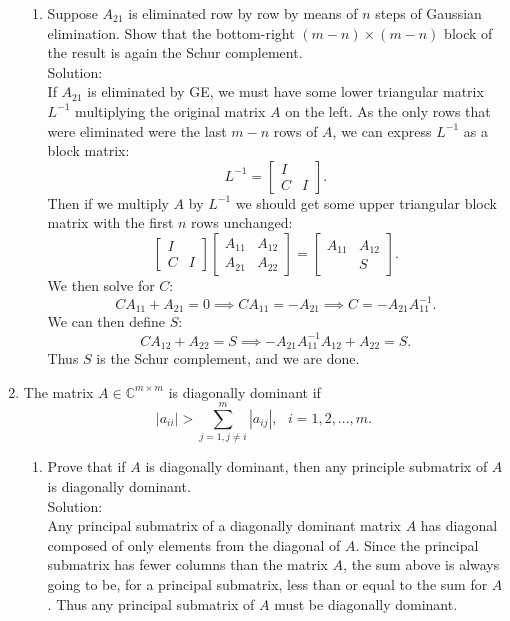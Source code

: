 \documentclass[12pt]{article}
\numberwithin{equation}{section}
\newcommand{\A}{\mathcal{A}}
\begin{document}
\begin{enumerate}
\begin{enumerate}
\item Suppose $A_{21}$ is eliminated row by row by means of $n$ steps of Gaussian elimination. Show that the bottom-right $(m-n)\times (m-n)$ block of the result is again the Schur complement.\\

Solution:\\

If $A_{21}$ is eliminated by GE, we must have some lower triangular matrix $L^{-1}$ multiplying the original matrix $A$ on the left. As the only rows that were eliminated were the last $m-n$ rows of $A$, we can express $L^{-1}$ as a block matrix:
$$L^{-1}=\left[\begin{array}{cc}I&\\C&I\end{array}\right].$$
Then if we multiply $A$ by $L^{-1}$ we should get some upper triangular block matrix with the first $n$ rows unchanged:
$$\left[\begin{array}{cc}I&\\C&I\end{array}\right]\left[\begin{array}{cc}A_{11}&A_{12}\\A_{21}&A_{22}\end{array}\right]=\left[\begin{array}{cc}A_{11}&A_{12}\\&S\end{array}\right].$$
We then solve for $C$:
$$CA_{11}+A_{21}=0\implies CA_{11}=-A_{21}\implies C=-A_{21}A_{11}^{-1}.$$
We can then define $S$:
$$CA_{12}+A_{22}=S\implies -A_{21}A_{11}^{-1}A_{12}+A_{22}=S.$$
Thus $S$ is the Schur complement, and we are done.
\end{enumerate}
\item The matrix $A\in\mathbb{C}^{m\times m}$ is diagonally dominant if
$$|a_{ii}|>\sum_{j=1,j\neq i}^m|a_{ij}|,\text{   }i=1,2,...,m.$$
\begin{enumerate}
\item Prove that if $A$ is diagonally dominant, then any principle submatrix of $A$ is diagonally dominant.\\
    
    Solution:\\
    
    Any principal submatrix of a diagonally dominant matrix $A$ has diagonal composed of only elements from the diagonal of $A$. Since the principal submatrix has fewer columns than the matrix $A$, the sum above is always going to be, for a principal submatrix, less than or equal to the sum for $A$. Thus any principal submatrix of $A$ must be diagonally dominant.\\



\end{enumerate}
\end{enumerate}
\end{document}
